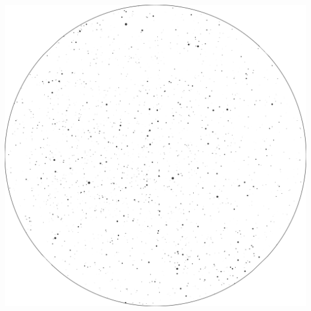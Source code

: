 \documentclass{./SAS-class-skygen}
\begin{document}
	\vspace{0.5cm}
    \begin{center}
    \includegraphics[width=\textwidth]{./pics/skychart16.png}
    \end{center}
    
    
\end{document}
